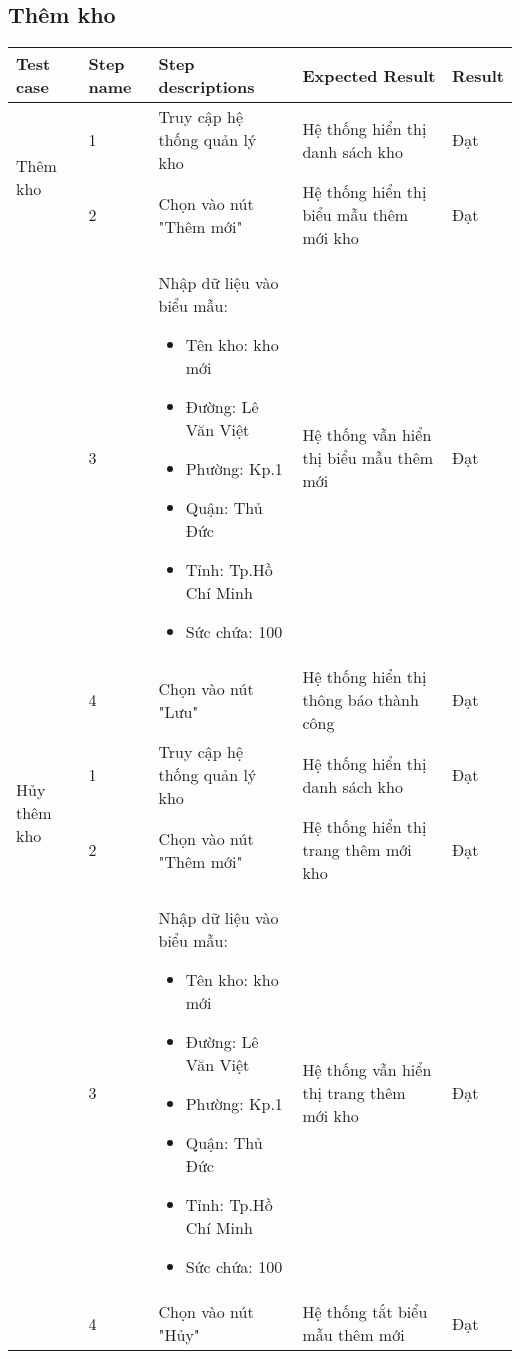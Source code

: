 \subsection{Thêm kho}
{
    \setlength\extrarowheight{6pt}
    \begin{longtable}{| p{2.5cm}| p{1cm}| p{5.5cm}| p{4.5cm} | p{1.5cm} |}
        \hline
        \textbf{Test case} & \textbf{Step name} & \textbf{Step descriptions} & \textbf{Expected Result} & \textbf{Result} \\
        \hline
        \multirow[t]{2}{2.5cm}{Thêm kho} & 1 & Truy cập hệ thống quản lý kho & Hệ thống hiển thị danh sách kho & Đạt \\
        \cline{2-5}
         & 2 & Chọn vào nút "Thêm mới" & Hệ thống hiển thị biểu mẫu thêm mới kho & Đạt \\
        \cline{2-5}
        & 3 & Nhập dữ liệu vào biểu mẫu:
        \begin{itemize}
            \item Tên kho: kho mới
            \item Đường: Lê Văn Việt
            \item Phường: Kp.1
            \item Quận: Thủ Đức 
            \item Tỉnh: Tp.Hồ Chí Minh
            \item Sức chứa: 100
        \end{itemize} & Hệ thống vẫn hiển thị biểu mẫu thêm mới & Đạt \\
        \cline{2-5}
         & 4 & Chọn vào nút "Lưu" & Hệ thống hiển thị thông báo thành công & Đạt \\
        \hline
        \multirow[t]{2}{2.5cm}{Hủy thêm kho} & 1 & Truy cập hệ thống quản lý kho & Hệ thống hiển thị danh sách kho & Đạt \\
        \cline{2-5}
         & 2 & Chọn vào nút "Thêm mới" & Hệ thống hiển thị trang thêm mới kho & Đạt \\
        \cline{2-5}
        & 3 & Nhập dữ liệu vào biểu mẫu:
        \begin{itemize}
            \item Tên kho: kho mới
            \item Đường: Lê Văn Việt
            \item Phường: Kp.1
            \item Quận: Thủ Đức 
            \item Tỉnh: Tp.Hồ Chí Minh
            \item Sức chứa: 100
        \end{itemize} & Hệ thống vẫn hiển thị trang thêm mới kho & Đạt \\
        \cline{2-5}
         & 4 & Chọn vào nút "Hủy" & Hệ thống tắt biểu mẫu thêm mới & Đạt \\
        \hline
    \end{longtable} 
}


